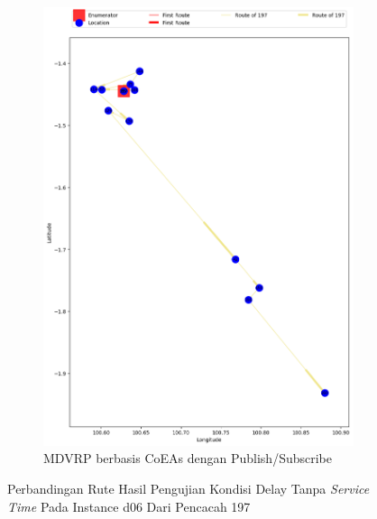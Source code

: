 \begin{figure}[H]\ContinuedFloat
	\centering
	\begin{subfigure}[t]{\textwidth}
		\centering
		\includegraphics[width=\textwidth]{Resources/Images/delayed_6/real_m15_n100_delayed_6_197_pubsub_coes}
		\caption{MDVRP berbasis CoEAs dengan Publish/Subscribe}
		\label{fig:real_m15_n100_delayed_6_197_pubsub_coes}
	\end{subfigure}
	\caption{Perbandingan Rute Hasil Pengujian Kondisi Delay Tanpa \textit{Service Time} Pada Instance d06 Dari Pencacah 197}
	\label{fig:real_m15_n100_delayed_6_197_contd}
\end{figure}


